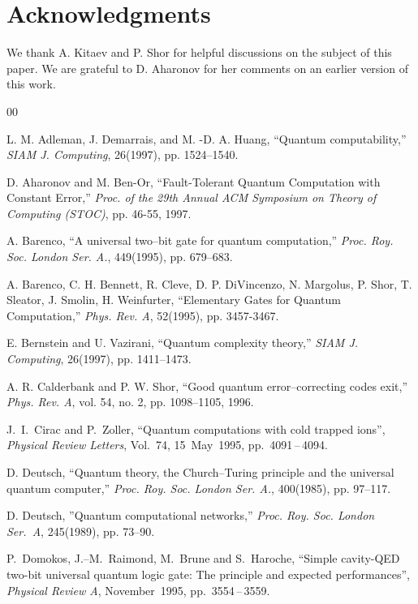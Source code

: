 \documentclass[twocolumn,11pt]{article}
\begin{document}
\section*{Acknowledgments}

We thank A. Kitaev and P. Shor for helpful discussions on the subject
of this paper. We are grateful to D. Aharonov for her comments on an earlier
version of this work.


\begin{thebibliography}{00}

L. M. Adleman, J. Demarrais, and M. -D. A. Huang, ``Quantum computability,''
{\em SIAM J. Computing}, 26(1997), pp. 1524--1540.

D. Aharonov and M. Ben-Or, 
``Fault-Tolerant Quantum Computation with Constant Error,'' {\em Proc. of
the 29th Annual ACM Symposium on Theory of Computing (STOC)}, pp. 46-55, 1997.

A. Barenco, ``A universal two--bit gate for quantum computation,'' 
{\em Proc. Roy. Soc. London Ser. A.}, 449(1995), pp. 679--683.

 A. Barenco, C. H. Bennett, R. Cleve, D. P. DiVincenzo,
N. Margolus, P. Shor, T. Sleator, J. Smolin, H. Weinfurter,
``Elementary Gates for Quantum Computation,'' {\em  Phys. Rev. A}, 52(1995),
pp. 3457-3467.

E. Bernstein and U. Vazirani, ``Quantum complexity theory,'' 
{\em SIAM J. Computing}, 26(1997), pp. 1411--1473.

A.  R.  Calderbank and P.  W.  Shor, ``Good quantum error--correcting 
codes exit,'' {\em Phys.  Rev.  A}, vol.  54, no.  2, pp. 1098--1105, 1996.

J.~I.~Cirac and P.~Zoller,
``Quantum computations with cold trapped ions'',
{\em Physical Review Letters}, Vol.~74, 15~May~1995, pp.~4091\,--\,4094.

D. Deutsch, ``Quantum theory, the Church--Turing principle and the universal 
quantum computer,'' {\em Proc. Roy. Soc. London Ser. A.}, 400(1985), pp.
97--117.

D. Deutsch, ''Quantum computational networks,''
{\em Proc. Roy. Soc. London Ser.~A}, 245(1989), pp. 73--90.

P.~Domokos, J.--M.~Raimond, M.~Brune and S.~Haroche,
``Simple cavity-QED \mbox{two-bit} universal quantum logic gate: The principle
and expected performances'',
{\it \mbox{Physical} Review A}, November~1995, pp.~3554\,--\,3559.


\end{thebibliography}
\end{document}
